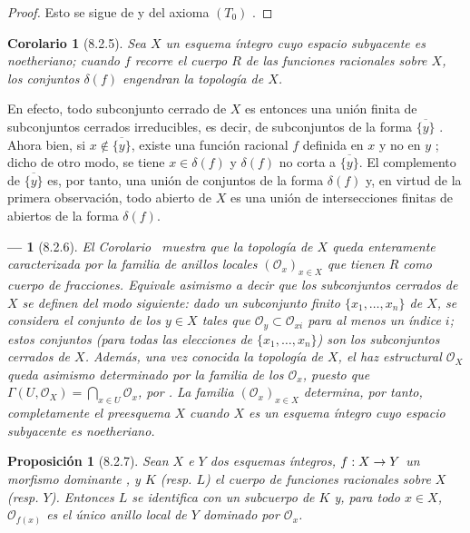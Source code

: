 \documentclass[oneside]{amsart}
\theoremstyle{ega-env-style}
\newtheorem*{env}{---}
\theoremstyle{ega-thm-env-style}
\newtheorem*{proposition}{Proposición}
\newtheorem*{corollary}{Corolario}
\theoremstyle{ega-defn-env-style}
\renewcommand{\to}{\mathchoice{\longrightarrow}{\rightarrow}{\rightarrow}{\rightarrow}}
\newcommand{\oldpage}[2][]{{\marginnote{\normalfont{\textbf{#1}~|~#2}}}\ignorespaces}
\let\EGAOriginalLabel\label
\renewcommand{\label}[1]{\phantomsection\EGAOriginalLabel{#1}}
\begin{document}
\oldpage[I]{167}
\begin{proof}
Esto se sigue de  y del axioma $(T_0)$ .
\end{proof}

\begin{corollary}[8.2.5]
\label{I.8.2.5}
Sea $X$ un esquema íntegro cuyo espacio subyacente es noetheriano;
cuando $f$ recorre el cuerpo $R$ de las funciones racionales sobre $X$, los conjuntos $\delta(f)$ engendran la topología de $X$.
\end{corollary}

En efecto, todo subconjunto cerrado de $X$ es entonces una unión finita de subconjuntos cerrados irreducibles, es decir, de subconjuntos de la forma $\overline{\{y\}}$ .
Ahora bien, si $x\notin\overline{\{y\}}$, existe una función racional $f$ definida en $x$ y no en $y$ ; dicho de otro modo, se tiene $x\in\delta(f)$ y $\delta(f)$ no corta a $\overline{\{y\}}$.
El complemento de $\overline{\{y\}}$ es, por tanto, una unión de conjuntos de la forma $\delta(f)$ y, en virtud de la primera observación, todo abierto de $X$ es una unión de intersecciones finitas de abiertos de la forma $\delta(f)$.

\begin{env}[8.2.6]
\label{I.8.2.6}
El Corolario~ muestra que la topología de $X$ queda enteramente caracterizada por la familia de anillos locales $(\mathscr{O}_x)_{x\in X}$ que tienen $R$ como cuerpo de fracciones.
Equivale asimismo a decir que los subconjuntos cerrados de $X$ se definen del modo siguiente: dado un subconjunto finito $\{x_1,\ldots,x_n\}$ de $X$, se considera el conjunto de los $y\in X$ tales que $\mathscr{O}_y\subset\mathscr{O}_{xi}$ para al menos un índice $i$; estos conjuntos (para todas las elecciones de $\{x_1,\ldots,x_n\}$) son los subconjuntos cerrados de $X$.
Además, una vez conocida la topología de $X$, el haz estructural $\mathscr{O}_X$ queda asimismo determinado por la familia de los $\mathscr{O}_x$, puesto que $\Gamma(U,\mathscr{O}_X)=\bigcap_{x\in U}\mathscr{O}_x$, por .
La familia $(\mathscr{O}_x)_{x\in X}$ determina, por tanto, completamente el preesquema $X$ cuando $X$ es un esquema íntegro cuyo espacio subyacente es noetheriano.
\end{env}

\begin{proposition}[8.2.7]
\label{I.8.2.7}
Sean $X$ e $Y$ dos esquemas íntegros, $f:X\to Y$ un morfismo dominante , y $K$ \textup{(resp. $L$)} el cuerpo de funciones racionales sobre $X$ \textup{(resp. $Y$)}.
Entonces $L$ se identifica con un subcuerpo de $K$ y, para todo $x\in X$, $\mathscr{O}_{f(x)}$ es el único anillo local de $Y$ dominado por $\mathscr{O}_x$.
\end{proposition}
\end{document}
